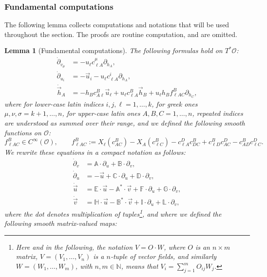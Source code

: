 \documentclass[11pt,a4paper]{article}
\theoremstyle{plain}
\newtheorem{lemma}[theorem]{Lemma}
\theoremstyle{definition}
\theoremstyle{remark}
\numberwithin{equation}{section}
\newcommand{\N}{\mathbb{N}} %
\newcommand{\A}{\mathbb{A}}
\newcommand{\B}{\mathbb{B}}
\newcommand{\C}{\mathbb{C}}
\newcommand{\D}{\mathbb{D}}
\newcommand{\E}{\mathbb{E}}
\newcommand{\F}{\mathbb{F}}
\newcommand{\G}{\mathbb{G}}
\renewcommand{\H}{\mathbb{H}}
\newcommand{\I}{\mathbb{I}}
\renewcommand{\L}{\mathbb{L}}
\begin{document}
\subsubsection{Fundamental computations}
The following lemma collects computations and notations that will be used throughout the section. The proofs are routine computation, and are omitted.
\begin{lemma}[Fundamental computations]\label{l:fundamentalcomputations}
The following formulas hold on $T^*\mathcal{O}$:
\begin{align}
\dot{\partial}_{v_\mu} & = -u_\ell c_{\ell A}^\mu \partial_{h_A},\\
\dot{\partial}_{u_i}  & = - \vec{u}_i - u_\ell c_{\ell A}^i \partial_{h_A},\\
\dot{{\vec{h}}}_{A}   &  =  - h_B c_{A \ell}^B \vec{u}_\ell +u_\ell c_{\ell A}^B \vec{h}_B + u_\ell h_B f_{\ell A C}^B \partial_{h_C},
\end{align}
where for lower-case latin indices $i,j,\ell=1,\dots,k$, for greek ones $\mu,\nu,\sigma=k+1,\dots,n$, for upper-case latin ones $A,B,C=1,\dots,n$, repeated indices are understood as summed over their range, and we defined the following smooth functions on $\mathcal{O}$:
\begin{equation}
f_{\ell A C}^B\in C^\infty(\mathcal{O}),\qquad f_{\ell A C}^B := X_\ell(c_{AC}^B) - X_A(c_{\ell C}^B) - c_{\ell A}^D c_{DC}^B +c_{\ell D}^B c_{AC}^D-c_{AD}^B  c_{\ell C}^D.
\end{equation}
We rewrite these equations in a compact notation as follows:\begin{align}
\dot{\partial}_v & = \A \cdot \partial_u + \B \cdot \partial_v, \label{eq:partialvdot}\\
\dot{\partial}_u & = -\vec{u} + \C \cdot \partial_u + \D \cdot \partial_v, \label{eq:partialudot}\\
\dot{\vec{u}} & =  \E \cdot \vec{u} -\A^* \cdot \vec{v} + \F \cdot \partial_u + \G \cdot \partial_v, \label{eq:vecudot} \\ 
\dot{\vec{v}} & = \H \cdot \vec{u}  -\B^* \cdot \vec{v} + \I \cdot \partial_u + \L \cdot \partial_v, \label{eq:vecvdot}
\end{align}
where the dot denotes multiplication of tuples\footnote{Here and in the following, the notation $V = O\cdot W$, where $O$ is an $n\times m$ matrix, $V=(V_1,\dots,V_n)$ is a $n$-tuple of vector fields, and similarly $W=(W_1,\dots,W_m)$, with $n,m \in \N$, means that $V_i = \sum_{j=1}^m O_{ij} W_j$.}, and where we defined the following smooth matrix-valued maps:

\end{lemma}
\end{document}
